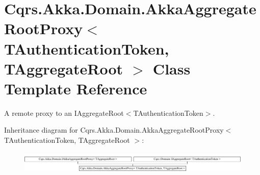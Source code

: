 \hypertarget{classCqrs_1_1Akka_1_1Domain_1_1AkkaAggregateRootProxy}{}\section{Cqrs.\+Akka.\+Domain.\+Akka\+Aggregate\+Root\+Proxy$<$ T\+Authentication\+Token, T\+Aggregate\+Root $>$ Class Template Reference}
\label{classCqrs_1_1Akka_1_1Domain_1_1AkkaAggregateRootProxy}


A remote proxy to an I\+Aggregate\+Root$<$\+T\+Authentication\+Token$>$.  


Inheritance diagram for Cqrs.\+Akka.\+Domain.\+Akka\+Aggregate\+Root\+Proxy$<$ T\+Authentication\+Token, T\+Aggregate\+Root $>$\+:\begin{figure}[H]
\begin{center}
\leavevmode
\includegraphics[height=1.081081cm]{classCqrs_1_1Akka_1_1Domain_1_1AkkaAggregateRootProxy}
\end{center}
\end{figure}
